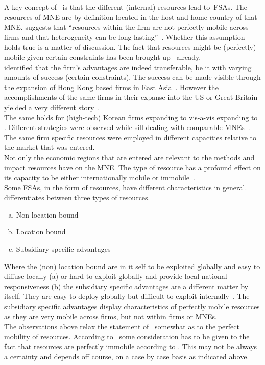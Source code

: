 A key concept of~\citep{Barney:1991ur,Barney:2001tj} is that the different (internal) resources lead to~\glspl{FSA}.
The resources of MNE are by definition located in the host and home country of that MNE\@. 
\cite{Barney:1991ur,Barney:1995tz} suggests that ``resources within the firm are not perfectly mobile across firms and that heterogeneity can be long lasting''~\citep{Barney:1991ur}.
Whether this assumption holds true is a matter of discussion.
The fact that resources might be (perfectly) mobile given certain constraints has been brought up~\citep{Lavie:2006up,Priem:2001vd} already.\\
\cite{Hu:1995vg} identified that the firm's advantages are indeed transferable, be it with varying amounts of success (certain constraints).
The success can be made visible through the expansion of Hong Kong based firms in East Asia~\citep{Hu:1995vg}.
However the accomplishments of the same firms in their expanse into the US or Great Britain yielded a very different story~\citep{Hu:1995vg}.\\
The same holds for (high-tech) Korean firms expanding to  vis-a-vis expanding to  . 
Different strategies were observed while sill dealing with comparable MNEs~\citep{Erramilli:1997wu}.
The same firm specific resources were employed in different capacities relative to the market that was entered.\\
Not only the economic regions that are entered are relevant to the methods and impact resources have on the MNE\@.
The type of resource has a profound effect on its capacity to be either internationally mobile or immobile~\citep{Tseng:2007wm}.\\
Some \glspl{FSA}, in the form of resources, have different characteristics in general. 
\cite{Rugman:2001ti} differentiates between three types of resources.
\begin{enumerate}[(a)]
   \setlength{\itemsep}{1pt}
\item Non location bound \fsa
\item Location bound \fsa 
\item Subsidiary specific advantages
\end{enumerate}
Where the (non) location bound \fsa are in it self to be exploited globally and easy to diffuse locally (a) or hard to exploit globally and provide local national responsiveness (b) the subsidiary specific advantages are a different matter by itself. 
They are easy to deploy globally but difficult to exploit internally~\citep{Rugman:2001ti}.
The subsidiary specific advantages display characteristics of perfectly mobile resources as they are very mobile across firms, but not within firms or MNEs.\\
The observations above relax the statement of~\cite{Barney:1991ur} somewhat as to the perfect mobility of resources.
According to~\citep{Rugman:2001ti,Tseng:2007wm,Erramilli:1997wu,Hu:1995vg,Rugman:1992uj} some consideration has to be given to the fact that resources are perfectly immobile according to \rbt.
This may not be always a certainty and depends off course, on a case by case basis as indicated above.
 
